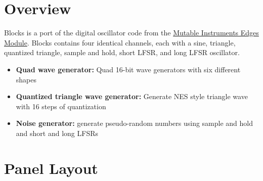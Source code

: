 \documentclass[12pt,letter]{article}
\begin{document}


\section{Overview}

Blocks is a port of the digital oscillator code from the \href{https://mutable-instruments.net/modules/edges/}{Mutable Instruments Edges Module}. Blocks contains four identical channels, each with a sine, triangle, quantized triangle, sample and hold, short LFSR, and long LFSR oscillator.
\begin{itemize}
\item \textbf{Quad wave generator:} Quad 16-bit wave generators with six different shapes
\item \textbf{Quantized triangle wave generator:} Generate NES style triangle wave with 16 steps of quantization
\item \textbf{Noise generator:} generate pseudo-random numbers using sample and hold and short and long LFSRs
\end{itemize}


\clearpage
\section{Panel Layout}
\end{document}

